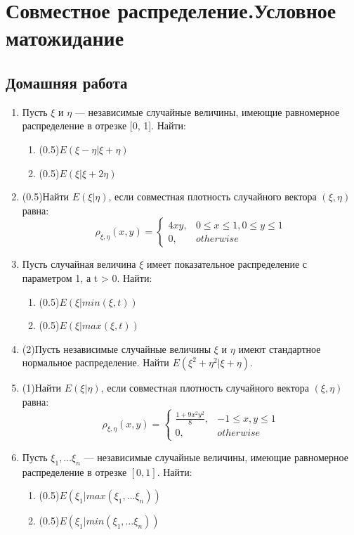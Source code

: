 \documentclass[a4paper, 14pt]{extarticle}
\begin{document}
\section*{Совместное распределение.Условное матожидание}
\subsection*{Домашняя работа}
\begin{enumerate}
\item Пусть $\xi$ и $\eta$ — независимые случайные величины, имеющие
равномерное распределение в отрезке [0, 1]. Найти:
\begin{enumerate}
\item (0.5)$E(\xi - \eta|\xi + \eta)$
\item (0.5)$E(\xi|\xi + 2\eta)$
\end{enumerate}
\item (0.5)Найти $E(\xi|\eta)$, если совместная плотность случайного вектора
$(\xi, \eta)$ равна:
$$\rho_{\xi,\eta}(x,y) =\left\{
	\begin{array}{cc}
	4xy, & 0\leq x\leq 1, 0\leq y\leq 1 \\
	0, & otherwise
	\end{array}\right.$$

\item Пусть случайная величина $\xi$ имеет показательное распределение 
с параметром 1, а t > 0. Найти:
\begin{enumerate}
\item (0.5)$E(\xi| min(\xi, t))$
\item (0.5)$E(\xi| max(\xi, t))$
\end{enumerate}
\item (2)Пусть независимые случайные величины $\xi$ и $\eta$ имеют стандартное
 нормальное распределение. Найти $E(\xi^2 + \eta^2 |\xi + \eta)$.
\item (1)Найти $E(\xi|\eta)$, если совместная плотность случайного вектора
$(\xi, \eta)$ равна:
	$$\rho_{\xi,\eta}(x,y) =\left\{
	\begin{array}{cc}
	\frac{1+9x^2y^2}{8}, & -1\leq x,y\leq 1\\
	0, & otherwise
	\end{array}\right.$$

\item Пусть $\xi_1, \ldots \xi_n$ — независимые случайные величины, имеющие
 равномерное распределение в отрезке $[0, 1]$. Найти:
\begin{enumerate}
\item (0.5)$E(\xi_1 | max(\xi_1, \ldots \xi_n))$
\item (0.5)$E(\xi_1 | min(\xi_1, \ldots \xi_n))$
\end{enumerate}

\end{enumerate}	
\end{document}
